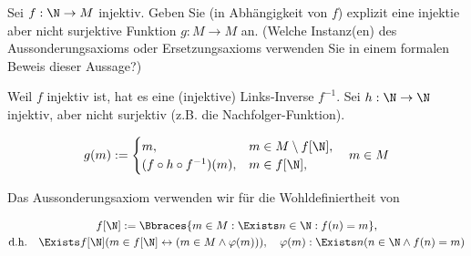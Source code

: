 
\begin{exercise}[269]

Sei $f: \N \to M$ injektiv.
Geben Sie (in Abhängigkeit von $f$) explizit eine injektie aber nicht surjektive Funktion $g: M \to M$ an.
(Welche Instanz(en) des Aussonderungsaxioms oder Ersetzungsaxioms verwenden Sie in einem formalen Beweis dieser Aussage?)

\end{exercise}


\begin{solution}

Weil $f$ injektiv ist, hat es eine (injektive) Links-Inverse $f^{-1}$.
Sei $h: \N \to \N$ injektiv, aber nicht surjektiv (z.B. die Nachfolger-Funktion).

\begin{align*}
    g(m)
    :=
    \begin{cases}
        m,                           & m \in M \setminus f[\N], \\
        (f \circ h \circ f^{-1})(m), & m \in f[\N],
    \end{cases}
    \quad
    m \in M
\end{align*}

Das Aussonderungsaxiom verwenden wir für die Wohldefiniertheit von

\begin{multline*}
    f[\N] := \Bbraces{m \in M: \Exists n \in \N: f(n) = m}, \\
    \text{d.h.}
    \quad
    \Exists f[\N] (m \in f[\N] \leftrightarrow (m \in M \land \varphi(m))),
    \quad
    \varphi(m): \Exists n (n \in \N \land f(n) = m)
\end{multline*}

\end{solution}
